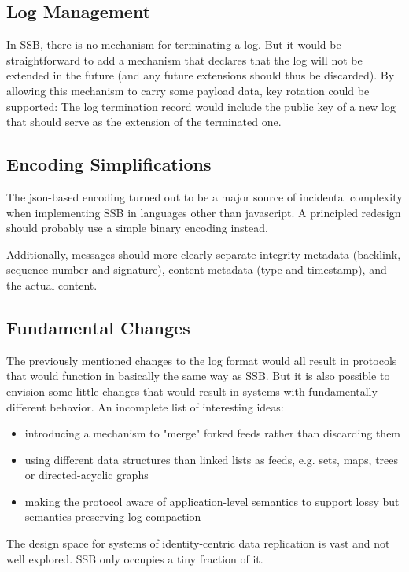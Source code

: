 \documentclass[sigconf]{acmart}
\begin{document}
\subsection{Log Management}

In SSB, there is no mechanism for terminating a log. But it would be straightforward to add a mechanism that declares that the log will not be extended in the future (and any future extensions should thus be discarded). By allowing this mechanism to carry some payload data, key rotation could be supported: The log termination record would include the public key of a new log that should serve as the extension of the terminated one.

\subsection{Encoding Simplifications}

The json-based encoding turned out to be a major source of incidental complexity when implementing SSB in languages other than javascript. A principled redesign should probably use a simple binary encoding instead.

Additionally, messages should more clearly separate integrity metadata (backlink, sequence number and signature), content metadata (type and timestamp), and the actual content.

\subsection{Fundamental Changes}

The previously mentioned changes to the log format would all result in protocols that would function in basically the same way as SSB. But it is also possible to envision some little changes that would result in systems with fundamentally different behavior. An incomplete list of interesting ideas:

\begin{itemize}
  \item introducing a mechanism to "merge" forked feeds rather than discarding them
  \item using different data structures than linked lists as feeds, e.g. sets, maps, trees or directed-acyclic graphs
  \item making the protocol aware of application-level semantics to support lossy but semantics-preserving log compaction
\end{itemize}

The design space for systems of identity-centric data replication is vast and not well explored. SSB only occupies a tiny fraction of it.
\end{document}
